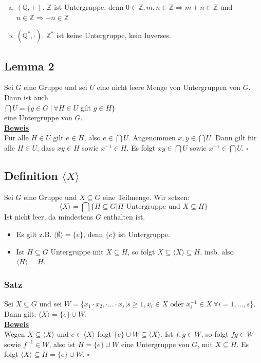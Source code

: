 \documentclass[a4paper, pagesize=pdftex, pdftex, twoside, headsepline, index=totoc,toc=listof, fontsize=10pt, cleardoublepage=empty, headinclude, DIV=13, BCOR=13mm]{scrartcl}
\newcommand{\bet}[1]{\uline{\textbf{#1}}} %
\newcommand{\lh}[1]{\langle #1 \rangle} %
\begin{document}
\begin{enumerate}[(a)]
	\item $(\mathds{Q}, +)$. $\mathds{Z}$  ist Untergruppe, denn $0 \in \mathds{Z}, m,n \in \mathds{Z} \Rightarrow m+n\in \mathds{Z}$ und $n\in \mathds{Z} \Rightarrow -n\in \mathds{Z}$
	\item $(\mathds{Q}^*,\cdot)$. $\mathds{Z}^*$ ist keine Untergruppe, kein Inverses.
\end{enumerate}

\subsection{Lemma 2}
\label{sub:lemma_2}
Sei $G$ eine Gruppe und sei $U$ eine nicht leere Menge von Untergruppen von $G$. Dann ist auch\\
$\bigcap U = \{g\in G~|~\forall H\in U$ gilt $g\in H\}$\\
eine Untergruppe von $G$.\\
\bet{Beweis}\\
Für alle $H\in U$ gilt $e\in H$, also $e\in \bigcap U$. Angenommen $x,y\in \bigcap U$. Dann gilt für alle $H\in U$, dass $xy\in H$ sowie $x^{-1}\in H$. Es folgt $xy\in \bigcap U$ sowie $x^{-1}\in \bigcap U$.
\hfill $\square$

\subsection{Definition $\lh{X}$}
\label{sub:def_lhX}
Sei $G$ eine Gruppe und $X \subseteq G$ eine Teilmenge. Wir setzen:
\[\lh{X}=\bigcap\{H\subseteq G | H \text{ Untergruppe und } X \subseteq H\}\]
Ist nicht leer, da mindestens $G$ enthalten ist.
\begin{itemize}
	\item Es gilt z.B. $\lh{\emptyset}=\{e\}$, denn $\{e\}$ ist Untergruppe.
	\item Ist $H \subseteq G$ Untergruppe mit $X \subseteq H$, so folgt $X\subseteq \lh{X} \subseteq H$, insb. also $\lh{H}=H$.
\end{itemize}

\subsubsection*{Satz}
Sei $X \subseteq G$ und sei $W=\{x_1\cdot x_2,\cdot \dots \cdot x_s | s\ge 1, x_i\in X \text{ oder } x_i^{-1}\in X ~\forall i=1,\dots,s\}$.\\
Dann gilt: $ \lh{X}=\{e\}\cup W$.\\
\bet{Beweis}\\
Wegen $X\subseteq \lh{X}$ und $e\in \lh{X}$ folgt $\{e\}\cup W\subseteq \lh{X}$. Ist $f,g\in W$, so folgt $fg\in W$ sowie $f^{-1}\in W$, also ist $H=\{e\}\cup W$ eine Untergruppe von $G$, mit $X\subseteq H$. Es folgt $\lh{X}\subseteq H=\{e\}\cup W$.
\hfill $\square$
\end{document}
